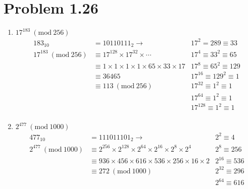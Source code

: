 \documentclass{article}
\newcommand{\Mod}[1]{\ (\mathrm{mod}\ #1)}
\begin{document}
\section*{Problem 1.26}
\begin{enumerate}[label=(\alph*)]
    \item \(17^{183} \Mod{256}\)
          \begin{align*}
              183_{10}           & = 10110111_2 \rightarrow                                          & 17^2 = 289 \equiv 33          \\
              17^{183} \Mod{256} & \equiv 17^{128} \times 17^{32} \times \cdots                      & 17^4 \equiv 33^2 \equiv 65    \\
                                 & \equiv 1 \times 1 \times 1 \times 1 \times 65 \times 33 \times 17 & 17^8 \equiv 65^2 \equiv 129   \\
                                 & \equiv   36465                                                    & 17^{16} \equiv 129^2 \equiv 1 \\
                                 & \equiv       113 \Mod{256}                                        & 17^{32} \equiv 1^2 \equiv 1   \\
                                 &                                                                   & 17^{64} \equiv 1^2 \equiv 1   \\
                                 &                                                                   & 17^{128} \equiv 1^2 \equiv 1  \\
          \end{align*}
    \item \(2^{477} \Mod{1000}\)
          \begin{align*}
              477_{10}           & = 111011101_2 \rightarrow                                                       & 2^2 \equiv 4       \\
              2^{477} \Mod{1000} & \equiv 2^{256} \times 2^{128} \times 2^{64} \times 2^{16} \times 2^8 \times 2^4 & 2^8 \equiv 256     \\
                                 & \equiv 936 \times 456 \times 616 \times 536 \times 256 \times 16 \times 2       & 2^{16} \equiv 536  \\
                                 & \equiv 272 \Mod{1000}                                                           & 2^{32} \equiv 296  \\
                                 &                                                                                 & 2^{64} \equiv 616  \\

\end{align*}
\end{enumerate}
\end{document}
